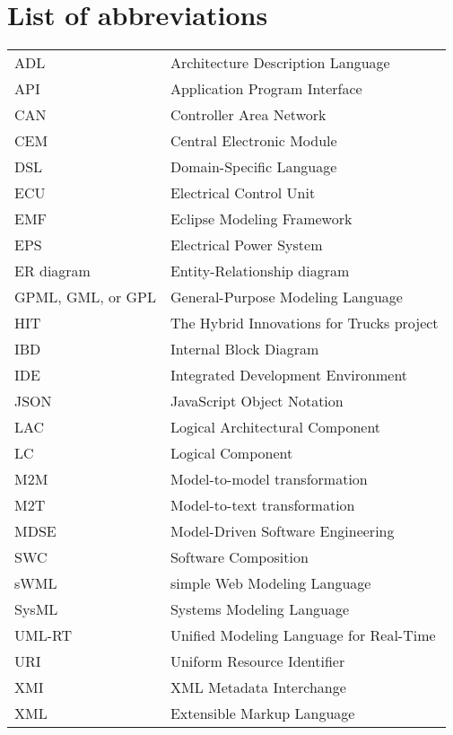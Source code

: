
\thispagestyle{plain}			%

\section*{List of abbreviations}

\begin{table}[H]
\begin{tabular}{ll}
ADL & Architecture Description Language \\
API & Application Program Interface \\
CAN & Controller Area Network \\
CEM & Central Electronic Module \\
DSL & Domain-Specific Language \\
ECU & Electrical Control Unit \\
EMF & Eclipse Modeling Framework \\
EPS & Electrical Power System \\
ER diagram & Entity-Relationship diagram \\
GPML, GML, or GPL & General-Purpose Modeling Language \\
HIT & The Hybrid Innovations for Trucks project \\
IBD & Internal Block Diagram \\
IDE & Integrated Development Environment \\
JSON & JavaScript Object Notation \\
LAC & Logical Architectural Component \\
LC & Logical Component \\
M2M & Model-to-model transformation \\
M2T & Model-to-text transformation \\
MDSE & Model-Driven Software Engineering \\
SWC & Software Composition \\
sWML & simple Web Modeling Language \\
SysML & Systems Modeling Language \\
UML-RT &  Unified Modeling Language for Real-Time \\
URI & Uniform Resource Identifier \\
XMI & XML Metadata Interchange \\
XML & Extensible Markup Language \\
\end{tabular}
\end{table}

